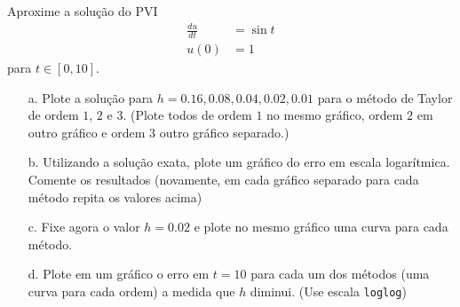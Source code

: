 \begin{ex}
Aproxime a solução do PVI
\begin{eqnarray}
   \frac{du}{dt} &=\sin{t}\\
            u(0) &= 1
\end{eqnarray}
para  $t\in [0,10]$.

\begin{enumerate}
\item [a.] Plote a solução para $h=0.16,0.08, 0.04, 0.02, 0.01$ para o método de Taylor de ordem $1$, $2$ e $3$. (Plote todos de ordem $1$ no mesmo gráfico, ordem $2$ em outro gráfico e ordem $3$ outro gráfico separado.)

\item [b.] Utilizando a solução exata, plote um gráfico do erro em escala logar\'itmica.
Comente os resultados (novamente, em cada gráfico separado para cada método repita os valores acima)

\item [c.] Fixe agora o valor $h=0.02$ e plote no mesmo gráfico uma curva para cada método.

\item [d.] Plote em um gráfico o erro em $t=10$ para cada um dos métodos (uma curva para cada ordem) a medida que $h$ diminui. (Use escala \verb#loglog#)
\end{enumerate}
\end{ex}











